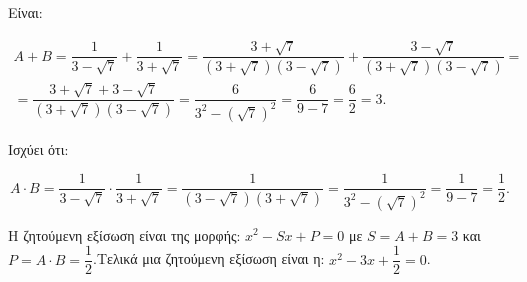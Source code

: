 
\begin{alist}
\item Είναι:

\begin{gather*}
A + B = \dfrac{1}{3 - \sqrt{7}} + \dfrac{1}{3 + \sqrt{7}} = \dfrac{3 + \sqrt{7}}{(3 + \sqrt{7})(3 - \sqrt{7})} + \dfrac{3 - \sqrt{7}}{(3 + \sqrt{7})(3 - \sqrt{7})} = \\
= \dfrac{3 + \sqrt{7} + 3 - \sqrt{7}}{(3 + \sqrt{7})(3 - \sqrt{7})} = \dfrac{6}{3^2 - (\sqrt{7})^2} = \dfrac{6}{9 - 7} = \dfrac{6}{2} = 3.
\end{gather*}

Ισχύει ότι:

\[A \cdot B = \dfrac{1}{3 - \sqrt{7}} \cdot \dfrac{1}{3 + \sqrt{7}} = \dfrac{1}{(3 - \sqrt{7})(3 + \sqrt{7})} = \dfrac{1}{3^2 - (\sqrt{7})^2} = \dfrac{1}{9 - 7} = \dfrac{1}{2}.\]

\item Η ζητούμενη εξίσωση είναι της μορφής: $x^2 - Sx + P = 0$ με $S = A + B = 3$ και $P = A \cdot B = \dfrac{1}{2}$.Τελικά μια ζητούμενη εξίσωση είναι η:
$x^2 - 3x + \dfrac{1}{2} = 0$.
\end{alist}

